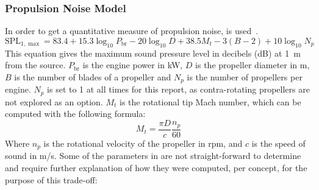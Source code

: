 \subsubsection{Propulsion Noise Model}
In order to get a quantitative
measure of propulsion noise,  is used~\cite{midtermnoise}.
\begin{equation}
\label{eq:propnoise}
    \mathrm{SPL}_{1, \max }=83.4+15.3 \log _{10} P_{\text{br}}-20 \log _{10} D+38.5 M_t-3(B-2)+10 \log _{10} N_p
\end{equation}
This equation gives the maximum sound pressure level in decibels (dB) at \qty{1}{m} from the source. $P_{\text{br}}$ is the engine power
in kW, $D$ is the propeller diameter in m, $B$ is the number of blades of a propeller and $N_p$ is the number of
propellers per engine. $N_p$ is set to 1 at all times for this report, as contra-rotating propellers are not explored as an option. $M_t$ is the rotational tip Mach number, which can be computed with the following formula:
\begin{equation}
\label{eq:mtnp}
    M_t=\frac{\pi D}{c} \frac{n_p}{60}
\end{equation}
Where $n_p$ is the rotational velocity of the propeller in rpm, and $c$ is the speed of sound in m/s.
Some of the parameters in  are not straight-forward to determine and require further explanation of how they were computed, per concept, for the purpose of this trade-off:
